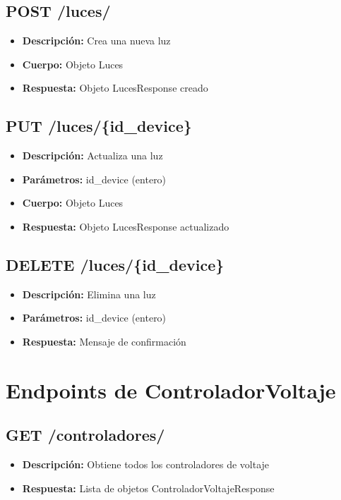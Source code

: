 \documentclass[12pt,letterpaper]{report}
\begin{document}
\subsection{POST /luces/}
\begin{itemize}
    \item \textbf{Descripción:} Crea una nueva luz
    \item \textbf{Cuerpo:} Objeto Luces
    \item \textbf{Respuesta:} Objeto LucesResponse creado
\end{itemize}

\subsection{PUT /luces/\{id\_device\}}
\begin{itemize}
    \item \textbf{Descripción:} Actualiza una luz
    \item \textbf{Parámetros:} id\_device (entero)
    \item \textbf{Cuerpo:} Objeto Luces
    \item \textbf{Respuesta:} Objeto LucesResponse actualizado
\end{itemize}

\subsection{DELETE /luces/\{id\_device\}}
\begin{itemize}
    \item \textbf{Descripción:} Elimina una luz
    \item \textbf{Parámetros:} id\_device (entero)
    \item \textbf{Respuesta:} Mensaje de confirmación
\end{itemize}

\section{Endpoints de ControladorVoltaje}
\subsection{GET /controladores/}
\begin{itemize}
    \item \textbf{Descripción:} Obtiene todos los controladores de voltaje
    \item \textbf{Respuesta:} Lista de objetos ControladorVoltajeResponse
\end{itemize}
\end{document}
